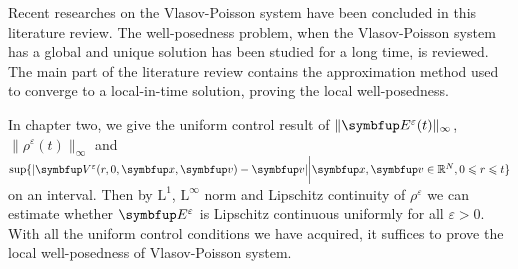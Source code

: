 \begin{eabstract}
Recent researches on the Vlasov-Poisson system have been concluded in this literature review. The well-posedness problem, when the Vlasov-Poisson system has a global and unique solution has been studied for a long time, is reviewed. The main part of the literature review contains the approximation method used to converge to a local-in-time solution, proving the local well-posedness. 



In chapter two, we give the uniform control result of $\|\vE^\varepsilon(t)\|_\infty$, $\|\rho^\varepsilon(t)\|_\infty$ and $\sup \{|\vect{V}^\varepsilon(r,0,\vx,\vv)-\vv| \bigg|\vx,\vv \in \bbR^N, 0\leqslant r \leqslant t \}$ on an interval. Then by $\mathrm{L}^1$, $\mathrm{L}^\infty$ norm and Lipschitz continuity of  $\rho^\varepsilon$ we can estimate whether $\vE^\varepsilon$ is  Lipschitz continuous uniformly for all $\varepsilon >0$. With all the uniform control conditions we have acquired, it suffices to prove the local well-posedness of Vlasov-Poisson system.


\end{eabstract}

  